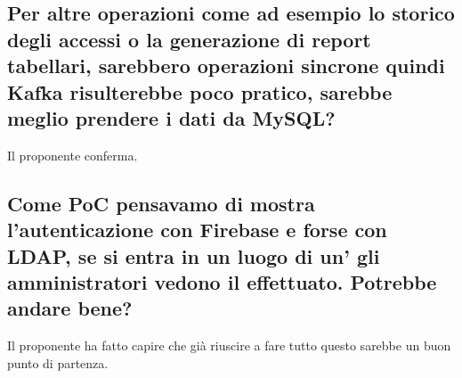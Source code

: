 \subsection{Per altre operazioni come ad esempio lo storico degli accessi o la generazione di report tabellari, sarebbero operazioni sincrone quindi Kafka risulterebbe poco pratico, sarebbe meglio prendere i dati da MySQL?}
Il proponente conferma.

\subsection{Come PoC pensavamo di mostra l'autenticazione con Firebase e forse con LDAP, se si entra in un luogo di un' gli amministratori vedono il  effettuato. Potrebbe andare bene?}
Il proponente ha fatto capire che già riuscire a fare tutto questo sarebbe un buon punto di partenza.

\clearpage
